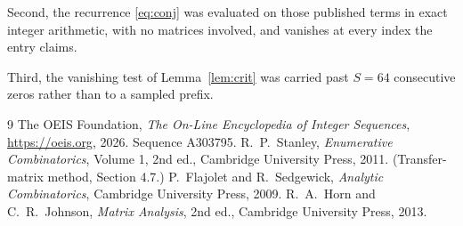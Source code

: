 \documentclass[11pt,a4paper]{article}
\theoremstyle{plain}
\theoremstyle{definition}
\begin{document}
Second, the recurrence \eqref{eq:conj} was evaluated on those published terms in exact
integer arithmetic, with no matrices involved, and vanishes at every index the entry claims.

Third, the vanishing test of Lemma~\ref{lem:crit} was carried past $S=64$ consecutive
zeros rather than to a sampled prefix.

\begin{thebibliography}{9}
 The OEIS Foundation, \emph{The On-Line Encyclopedia of Integer
Sequences}, \url{https://oeis.org}, 2026. Sequence A303795.
 R.~P.~Stanley, \emph{Enumerative Combinatorics}, Volume 1, 2nd ed.,
Cambridge University Press, 2011. (Transfer-matrix method, Section 4.7.)
 P.~Flajolet and R.~Sedgewick, \emph{Analytic Combinatorics}, Cambridge
University Press, 2009.
 R.~A.~Horn and C.~R.~Johnson, \emph{Matrix Analysis}, 2nd ed., Cambridge
University Press, 2013.
\end{thebibliography}
\end{document}
